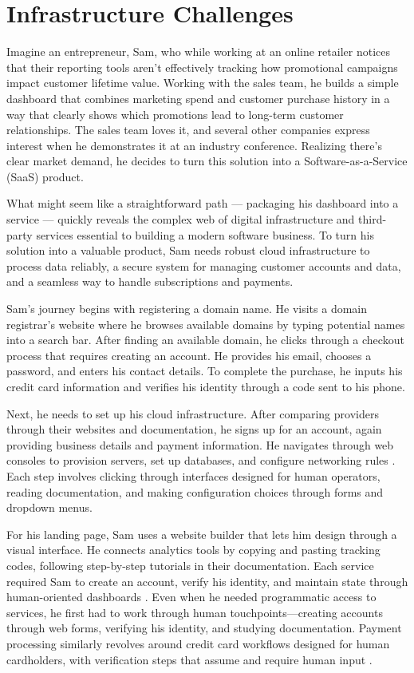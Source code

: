 \documentclass{article}
\begin{document}
\section{Infrastructure Challenges}

Imagine an entrepreneur, Sam, who while working at an online retailer notices that their reporting tools aren't effectively tracking how promotional campaigns impact customer lifetime value. Working with the sales team, he builds a simple dashboard that combines marketing spend and customer purchase history in a way that clearly shows which promotions lead to long-term customer relationships. The sales team loves it, and several other companies express interest when he demonstrates it at an industry conference. Realizing there's clear market demand, he decides to turn this solution into a Software-as-a-Service (SaaS) product.

What might seem like a straightforward path — packaging his dashboard into a service — quickly reveals the complex web of digital infrastructure and third-party services essential to building a modern software business. To turn his solution into a valuable product, Sam needs robust cloud infrastructure to process data reliably, a secure system for managing customer accounts and data, and a seamless way to handle subscriptions and payments.

Sam's journey begins with registering a domain name. He visits a domain registrar's website where he browses available domains by typing potential names into a search bar. After finding an available domain, he clicks through a checkout process that requires creating an account. He provides his email, chooses a password, and enters his contact details. To complete the purchase, he inputs his credit card information and verifies his identity through a code sent to his phone.

Next, he needs to set up his cloud infrastructure. After comparing providers through their websites and documentation, he signs up for an account, again providing business details and payment information. He navigates through web consoles to provision servers, set up databases, and configure networking rules \cite{marinescu2022cloud}. Each step involves clicking through interfaces designed for human operators, reading documentation, and making configuration choices through forms and dropdown menus.

For his landing page, Sam uses a website builder that lets him design through a visual interface. He connects analytics tools by copying and pasting tracking codes, following step-by-step tutorials in their documentation. Each service required Sam to create an account, verify his identity, and maintain state through human-oriented dashboards \cite{cameron2005laws}. Even when he needed programmatic access to services, he first had to work through human touchpoints—creating accounts through web forms, verifying his identity, and studying documentation. Payment processing similarly revolves around credit card workflows designed for human cardholders, with verification steps that assume and require human input \cite{haldane2008future}.
\end{document}
